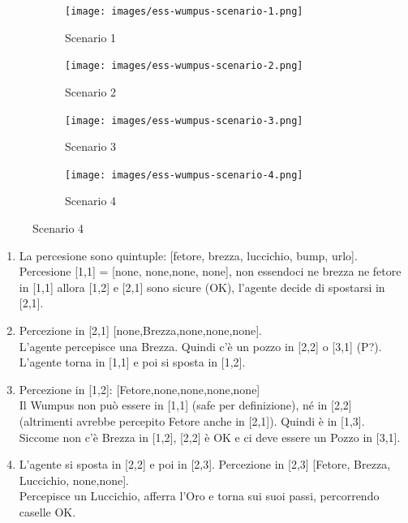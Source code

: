 \begin{figure}[h!]
    \begin{subfigure}{0.24\textwidth}
        \centering
        \texttt{[image: images/ess-wumpus-scenario-1.png]}
        \caption{Scenario 1}
    \end{subfigure}
    \begin{subfigure}{0.24\textwidth}
        \centering
        \texttt{[image: images/ess-wumpus-scenario-2.png]}
        \caption{Scenario 2}
    \end{subfigure}
    \begin{subfigure}{0.24\textwidth}
        \centering
        \texttt{[image: images/ess-wumpus-scenario-3.png]}
        \caption{Scenario 3}
    \end{subfigure}
    \begin{subfigure}{0.24\textwidth}
        \centering
        \texttt{[image: images/ess-wumpus-scenario-4.png]}
        \caption{Scenario 4}
    \end{subfigure}
\end{figure}
\begin{enumerate}
    \item La percesione sono quintuple: [fetore, brezza, luccichio, bump, urlo].\\
    Percesione [1,1] = [none, none,none, none], non essendoci ne brezza ne fetore in [1,1] allora
    [1,2] e [2,1] sono sicure (OK), l'agente decide di spostarsi in [2,1].
    \item Percezione in [2,1] [none,Brezza,none,none,none].\\
    L’agente percepisce una Brezza. Quindi c’è un pozzo in [2,2] o [3,1] (P?). L’agente torna in [1,1] e poi si
    sposta in [1,2].
    \item Percezione in [1,2]: [Fetore,none,none,none,none]\\
    Il Wumpus non può essere in [1,1] (safe per definizione), né in [2,2] (altrimenti avrebbe percepito Fetore anche in [2,1]). Quindi è in [1,3].\\
    Siccome non c’è Brezza in [1,2], [2,2] è OK e ci deve essere un Pozzo in [3,1].
    \item L’agente si sposta in [2,2] e poi in [2,3]. Percezione in [2,3] [Fetore, Brezza, Luccichio, none,none].\\
    Percepisce un Luccichio, afferra l’Oro e torna sui suoi passi, percorrendo caselle OK.
\end{enumerate}

\newpage
